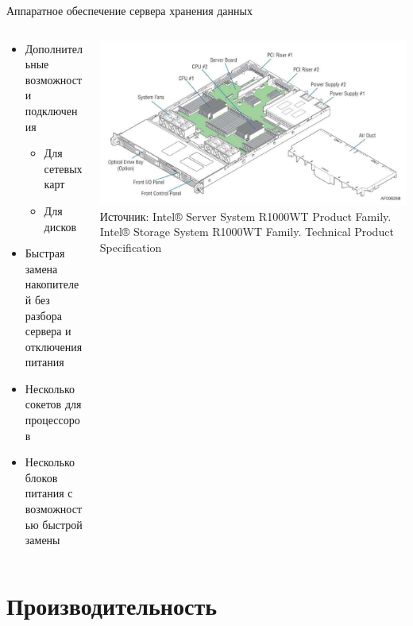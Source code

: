 \documentclass[aspectratio=169]{beamer}
\begin{document}
\begin{frame}{Аппаратное обеспечение сервера хранения данных}
\begin{columns}
    \begin{column}{.35\textwidth}
        \begin{itemize}
            \item Дополнительные возможности подключения
            \vspace{-1em}
            \begin{itemize}
                \item Для сетевых карт
                \item Для дисков
            \end{itemize}
            \item Быстрая замена накопителей без разбора сервера и отключения питания
            \item Несколько сокетов для процессоров
            \item Несколько блоков питания с возможностью быстрой замены
        \end{itemize}
    \end{column}
    \begin{column}{.6\textwidth}
        \centering
        \includegraphics[scale=0.2]{fig/8.server.jpg}
        \tiny Источник: Intel® Server System R1000WT Product Family. Intel® Storage System R1000WT Family. Technical Product Specification
    \end{column}
\end{columns}
\end{frame}

\section{Производительность}
\end{document}
